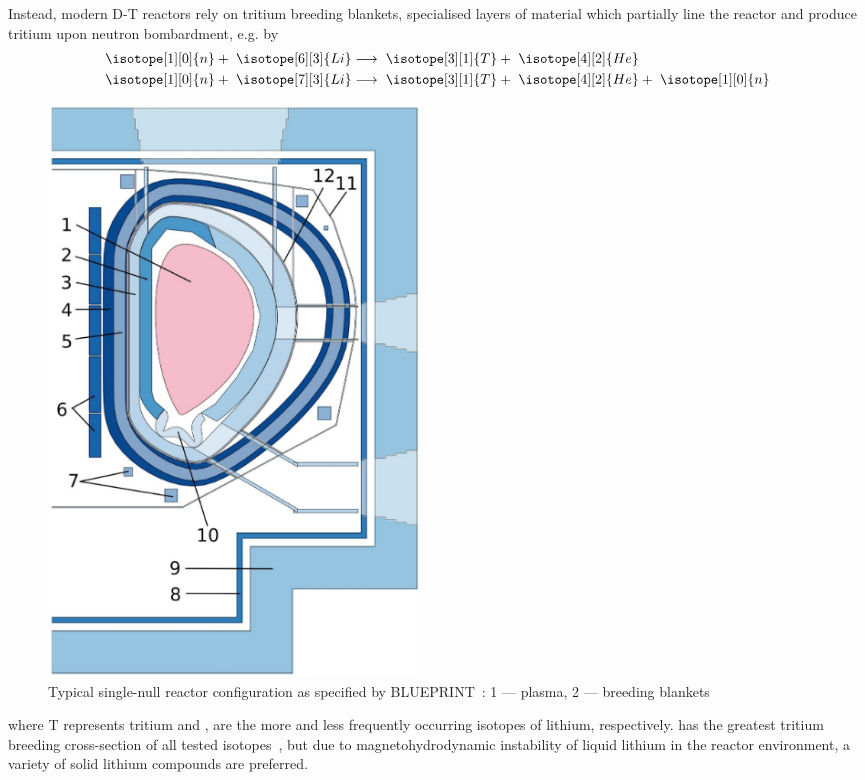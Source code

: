 Instead, modern D-T reactors rely on tritium breeding blankets, specialised
layers of material which partially line the reactor and produce tritium upon
neutron bombardment, e.g. by 
\begin{align}
	\isotope[1][0]{n} + \hspace{3pt} \isotope[6][3]{Li} 
	&\longrightarrow \hspace{3pt} 
	\isotope[3][1]{T} + \hspace{3pt}\isotope[4][2]{He} \\
	\isotope[1][0]{n} + \hspace{3pt} \isotope[7][3]{Li} 
	&\longrightarrow \hspace{3pt} 
	\isotope[3][1]{T} + \hspace{3pt} \isotope[4][2]{He} + \hspace{3pt} \isotope[1][0]{n}
\end{align}
\begin{figure}
  \vspace{-20pt}
  \begin{center}
    \includegraphics[width=0.48\textwidth]{fig1_tokamakdiagram.png}
  \end{center}
  \caption{Typical single-null reactor configuration as specified by BLUEPRINT~\cite{Coleman2019}: 1 — plasma,
2 — breeding blankets }
\label{fig:tokamak}
\end{figure}
where T represents tritium and ,  are the more and
less frequently occurring isotopes of lithium, respectively.  has
the greatest tritium breeding cross-section of all tested isotopes~\cite{Hernandez2018}, but due
to magnetohydrodynamic instability of liquid lithium in the reactor environment,
a variety of solid lithium compounds are preferred.

